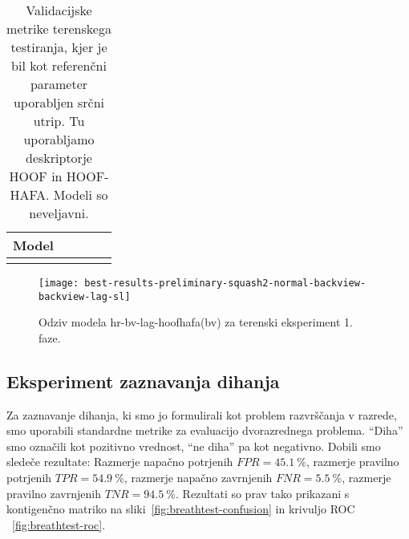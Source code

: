 \begin{table}[!htbp]
	\centering
	\begin{tabular}{l S[table-format=1.2, round-mode=places, round-precision=2] S[table-format=1.2, round-mode=places, round-precision=2] S[table-format=1.2, round-mode=places, round-precision=2] S[table-format=1.2, round-mode=places, round-precision=2]}
		\toprule
		\textbf{Model} & \thead{\corr} & \thead{\rae} & \thead{\rrse} & \theadm{\nsv}\\
		\midrule
		\bottomrule
	\end{tabular}
	\caption[Validacijske metrike terenskega testiranja]{Validacijske metrike terenskega testiranja, kjer je bil kot referenčni parameter uporabljen srčni utrip. Tu uporabljamo deskriptorje HOOF in HOOF-HAFA. Modeli so neveljavni.}
	\label{tab:squash}
\end{table}

\begin{figure}[!htbp]
	\centering
	\texttt{[image: best-results-preliminary-squash2-normal-backview-backview-lag-sl]}
	\caption[Odziv modela hr-bv-lag-hoofhafa(bv) za terenski eksperiment 1. faze]{Odziv modela hr-bv-lag-hoofhafa(bv) za terenski eksperiment 1. faze.}
	\label{fig:squash-rezultat}
\end{figure}






















\subsection{Eksperiment zaznavanja dihanja}
Za zaznavanje dihanja, ki smo jo formulirali kot problem razvrščanja v razrede, smo uporabili standardne metrike za evaluacijo dvorazrednega problema. ``Diha'' smo označili kot pozitivno vrednost, ``ne diha'' pa kot negativno. Dobili smo sledeče rezultate: Razmerje napačno potrjenih $FPR = \SI{45.1}{\%}$, razmerje pravilno potrjenih $TPR = \SI{54.9}{\%}$, razmerje napačno zavrnjenih $FNR = \SI{5.5}{\%}$, razmerje pravilno zavrnjenih $TNR = \SI{94.5}{\%}$. Rezultati so prav tako prikazani s kontigenčno matriko na sliki~\ref{fig:breathtest-confusion} in krivuljo ROC ~\ref{fig:breathtest-roc}.

